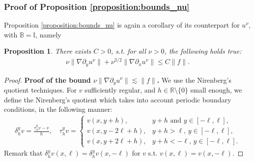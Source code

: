 \documentclass[report]{elsarticle}
\newtheorem{proposition}[theorem]{Proposition}
\numberwithin{theorem}{section}
\begin{document}
\subsubsection{Proof of Proposition \ref{proposition:bounds_nu}}
\label{sec:proof_bounds_nu}
Proposition \ref{proposition:bounds_nu} is again a corollary of its counterpart for $u^{\nu}$, with $\mathbb{B}=\mathbb{I}$, namely
\begin{proposition}
	\label{proposition:bounds_nu_appendix}
	There exists $C>0$, s.t. for all $\nu>0$, the following holds true: 
	\begin{align*}	
		\nu\|\nabla \partial_y u^{\nu}\|+\nu^{3/2} \|\nabla \partial_x u^{\nu}\|\leq C\|f\|.
	\end{align*}
\end{proposition}
\begin{proof}
	\textbf{Proof of the bound $\nu\|\nabla \partial_y u^{\nu}\|\lesssim \|f\|$.} We use the Nirenberg's quotient techniques. 
	For $v$ sufficiently regular, and $h\in \mathbb{R}\setminus\{0\}$ small enough, we define the Nirenberg's quotient which takes into account periodic boundary conditions, in the following manner:
	\begin{align*}
		\delta_h^y v=\frac{\tau_h^y v-v}{h}, \quad \tau_h^y v=\left\{
		\begin{array}{ll}
			v(x,y+h), & y+h \text{ and } y\in [-\ell,\ell],\\
			v(x,y-2\ell+h), & y+h>\ell,\, y\in [-\ell,\ell],\\
			v(x,y+2\ell+h), & y+h<-\ell,\, y\in [-\ell,\ell].
		\end{array}
		\right.
	\end{align*}
	Remark that $\delta_h^y v(x, \ell)=\delta_h^y v(x,-\ell)$ for $v$ s.t. $v(x,\ell)=v(x,-\ell)$. 
	

\end{proof}
\end{document}
